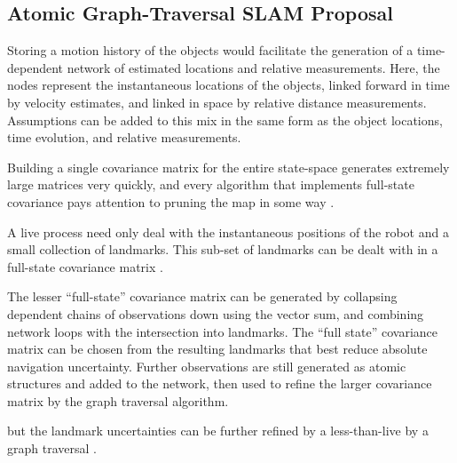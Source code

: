 \documentclass{article}
\begin{document}
\begin{appendices}
%    


  \section{Atomic Graph-Traversal SLAM Proposal} \label{sec:SLAMproposal}
    
    Storing a motion history of the objects would facilitate the generation of a time-dependent network of estimated locations and relative measurements.
    Here, the nodes represent the instantaneous locations of the objects, linked forward in time by velocity estimates, and linked in space by relative distance measurements.  Assumptions can be added to this mix in the same form as the object locations, time evolution, and relative measurements.

    Building a single covariance matrix for the entire state-space generates extremely large matrices very quickly, and every algorithm that implements full-state covariance pays attention to pruning the map in some way\cite{monoslam} \cite{airshipSLAM}.
    
    A live process need only deal with the instantaneous positions of the robot and a small collection of landmarks. This sub-set of landmarks can be dealt with in a full-state covariance matrix \cite{monoslam}.  
    
    The lesser ``full-state'' covariance matrix can be generated by collapsing dependent chains of observations down using the vector sum, and combining network loops with the intersection into landmarks.  The ``full state'' covariance matrix can be chosen from the resulting landmarks that best reduce absolute navigation uncertainty.  Further observations are still generated as atomic structures and added to the network, then used to refine the larger covariance matrix by the graph traversal algorithm.  

    but the landmark uncertainties can be further refined by a less-than-live by a graph traversal \cite{SLAMgraph}.




\end{appendices}

  
\end{document}
